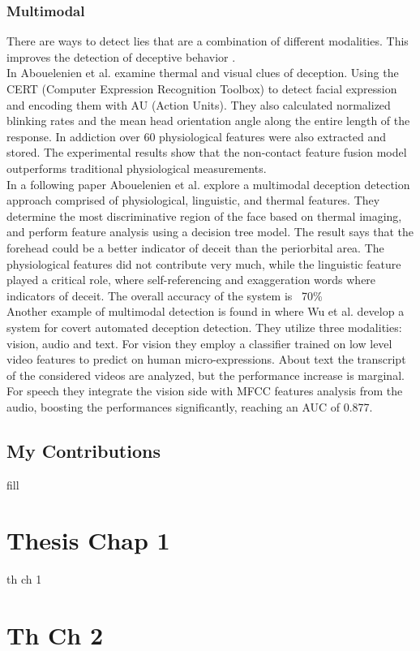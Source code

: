 \documentclass[LaM,binding=0.6cm,english,noexaminfo]{sapthesis}
\begin{document}
\subsection*{Multimodal}
There are ways to detect lies that are a combination of different modalities. This improves the detection of deceptive behavior \cite{Abouelenien:2014:DDU:2663204.2663229}. \\
In \cite{Abouelenien:2016:ATV:2910674.2910682} Abouelenien et al. examine thermal and visual clues of deception. Using the CERT (Computer Expression Recognition Toolbox) to detect facial expression and encoding them with AU (Action Units). They also calculated normalized blinking rates and the mean head orientation angle along the entire length of the response. In addiction over 60 physiological features were also extracted and stored. The experimental results show that the non-contact feature fusion model outperforms traditional physiological measurements.\\
In a following paper \cite{7782429} Abouelenien et al. explore a multimodal deception detection approach comprised of physiological, linguistic, and thermal features. They determine the most discriminative region of the face based on thermal imaging, and perform feature analysis using a decision tree model. The result says that the forehead could be a better indicator of deceit than the periorbital area. The physiological features did not contribute very much, while the linguistic feature played a critical role, where self-referencing and exaggeration words where indicators of deceit. The overall accuracy of the system is ~70\%\\
Another example of multimodal detection is found in \cite{DBLP:journals/corr/abs-1712-04415} where Wu et al. develop a system for covert automated deception detection. They utilize three modalities: vision, audio and text. For vision they employ a classifier trained on low level video features to predict on human micro-expressions. About text the transcript of the considered videos are analyzed, but the performance increase is marginal. For speech they integrate the vision side with MFCC features analysis from the audio, boosting the performances significantly, reaching an AUC of 0.877. \\

\pagebreak

\section{My Contributions} \label{contrib}
fill


\chapter{Thesis Chap 1}
th ch 1

\chapter{Th Ch 2}


\backmatter

\printbibliography

\cleardoublepage
\end{document}
